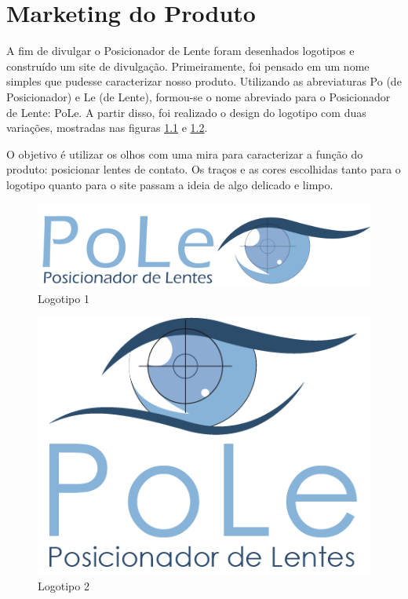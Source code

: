 \chapter[Marketing do Produto]{Marketing do Produto}

A fim de divulgar o Posicionador de Lente foram desenhados logotipos e construído um site de divulgação. Primeiramente, foi pensado em um nome simples que pudesse caracterizar nosso produto. Utilizando as abreviaturas Po (de Posicionador) e Le (de Lente), formou-se o nome abreviado para o Posicionador de Lente: PoLe. A partir disso, foi realizado o design do logotipo com duas variações, mostradas nas figuras \ref{logo1} e \ref{logo2}. 

O objetivo é utilizar os olhos com uma mira para caracterizar a função do produto: posicionar lentes de contato. Os traços e as cores escolhidas tanto para o logotipo quanto para o site passam a ideia de algo delicado e limpo.

\begin{figure}[H]
		\centering
			\includegraphics[scale=0.5, angle=90]{figuras/logo1.png}
		\caption{Logotipo 1}
		\label{logo1}
\end{figure}

\begin{figure}[H]
		\centering
			\includegraphics[scale=1.0]{figuras/logo2.png}
		\caption{Logotipo 2}
		\label{logo2}
\end{figure}


